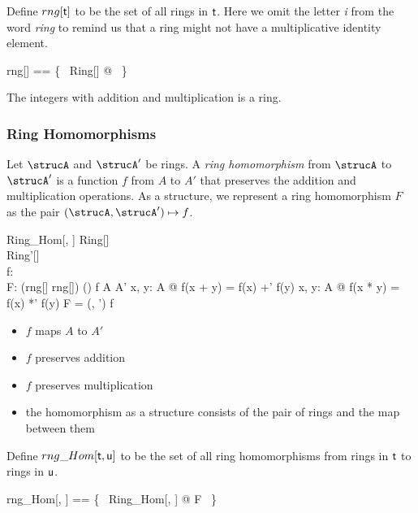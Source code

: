 \documentclass{amsart}
\begin{document}
Define $rng[\mathsf{t}]$ to be the set of all rings in $\mathsf{t}$.
Here we omit the letter \textit{i} from the word \textit{ring} to remind us that
a ring might not have a multiplicative identity element.
\begin{zed}
	rng[\genT] == \{~ Ring[\genT] @ \strucA ~\}
\end{zed}

\begin{example}
The integers with addition and multiplication is a ring.
\end{example}

\subsubsection{Ring Homomorphisms}

Let $\strucA$ and $\strucA'$ be rings.
A \textit{ring homomorphism} from $\strucA$ to $\strucA'$ is a function $f$ from $A$ to $A'$ 
that preserves the addition and multiplication operations.
As a structure, we represent a ring homomorphism $F$ as the pair $(\strucA, \strucA') \mapsto f$.

\begin{schema}{Ring\_Hom}[\genT, \genU]
	Ring[\genT] \\
	Ring'[\genU] \\
	f: \genT \pfun \genU \\
	F: (rng[\genT] \cross rng[\genU]) \cross (\genT \pfun \genU)
\where
	f \in A \fun A'
\also
	\forall x, y: A @ f(x + y) = f(x) +' f(y)
\also
	\forall x, y:	 A @ f(x * y) = f(x) *' f(y)
\also
	F = (\strucA, \strucA') \mapsto f
\end{schema}

\begin{itemize}
	\item $f$ maps $A$ to $A'$
	\item $f$ preserves addition
	\item $f$ preserves multiplication
	\item the homomorphism as a structure consists of the pair of rings and the map between them
\end{itemize}

Define $rng\_Hom[\mathsf{t}, \mathsf{u}]$ to be the set of all ring homomorphisms from rings in $\mathsf{t}$
to rings in $\mathsf{u}$.

\begin{zed}
	rng\_Hom[\genT, \genU] == \{~ Ring\_Hom[\genT, \genU] @ F ~\}
\end{zed}
\end{document}
